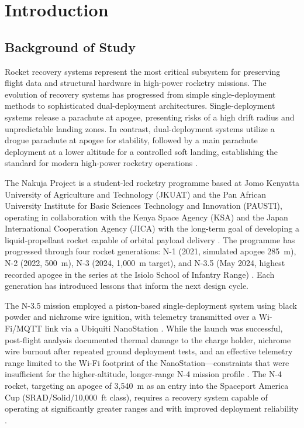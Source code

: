 \section{Introduction}\label{sec:introduction}

\subsection{Background of Study}

Rocket recovery systems represent the most critical subsystem for preserving flight data and structural hardware in high-power rocketry missions. The evolution of recovery systems has progressed from simple single-deployment methods to sophisticated dual-deployment architectures. Single-deployment systems release a parachute at apogee, presenting risks of a high drift radius and unpredictable landing zones. In contrast, dual-deployment systems utilize a drogue parachute at apogee for stability, followed by a main parachute deployment at a lower altitude for a controlled soft landing, establishing the standard for modern high-power rocketry operations \cite{sutton_rocket, parachute_deployment}.

The Nakuja Project is a student-led rocketry programme based at Jomo Kenyatta University of Agriculture and Technology (JKUAT) and the Pan African University Institute for Basic Sciences Technology and Innovation (PAUSTI), operating in collaboration with the Kenya Space Agency (KSA) and the Japan International Cooperation Agency (JICA) with the long-term goal of developing a liquid-propellant rocket capable of orbital payload delivery \cite{nakuja_website}. The programme has progressed through four rocket generations: N-1 (2021, simulated apogee 285~m), N-2 (2022, 500~m), N-3 (2024, 1,000~m target), and N-3.5 (May 2024, highest recorded apogee in the series at the Isiolo School of Infantry Range) \cite{nakuja_website}. Each generation has introduced lessons that inform the next design cycle.

The N-3.5 mission employed a piston-based single-deployment system using black powder and nichrome wire ignition, with telemetry transmitted over a Wi-Fi/MQTT link via a Ubiquiti NanoStation \cite{n3p5_recovery_report}. While the launch was successful, post-flight analysis documented thermal damage to the charge holder, nichrome wire burnout after repeated ground deployment tests, and an effective telemetry range limited to the Wi-Fi footprint of the NanoStation---constraints that were insufficient for the higher-altitude, longer-range N-4 mission profile \cite{n3p5_recovery_report, n4_poptest_internal}. The N-4 rocket, targeting an apogee of 3,540~m as an entry into the Spaceport America Cup (SRAD/Solid/10,000~ft class), requires a recovery system capable of operating at significantly greater ranges and with improved deployment reliability \cite{nakuja_website}.

